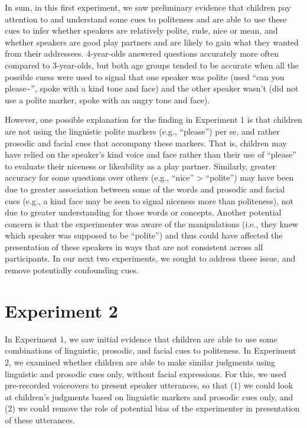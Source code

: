 \documentclass[10pt, letterpaper]{article}
\begin{document}
In sum, in this first experiment, we saw preliminary evidence that
children pay attention to and understand some cues to politeness and are
able to use these cues to infer whether speakers are relatively polite,
rude, nice or mean, and whether speakers are good play partners and are
likely to gain what they wanted from their addressees. 4-year-olds
answered questions accurately more often compared to 3-year-olds, but
both age groups tended to be accurate when all the possible cuess were
used to signal that one speaker was polite (used ``can you
please\textasciitilde{}'', spoke with a kind tone and face) and the
other speaker wasn't (did not use a polite marker, spoke with an angry
tone and face).

However, one possible explanation for the finding in Experiment 1 is
that children are not using the linguistic polite markers (e.g.,
``please'') per se, and rather prosodic and facial cues that accompany
these markers. That is, children may have relied on the speaker's kind
voice and face rather than their use of ``please'' to evaluate their
niceness or likeability as a play partner. Similarly, greater accuracy
for some questions over others (e.g., ``nice'' \textgreater{}
``polite'') may have been due to greater association between some of the
words and prosodic and facial cues (e.g., a kind face may be seen to
signal niceness more than politeness), not due to greater understanding
for those words or concepts. Another potential concern is that the
experimenter was aware of the manipulations (i.e., they knew which
speaker was supposed to be ``polite'') and thus could have affected the
presentation of these speakers in ways that are not consistent across
all participants. In our next two experiments, we sought to address
these issue, and remove potentially confounding cues.

\section{Experiment 2}\label{experiment-2}

In Experiment 1, we saw initial evidence that children are able to use
some combinations of linguistic, prosodic, and facial cues to
politeness. In Experiment 2, we examined whether children are able to
make similar judgments using linguistic and prosodic cues only, without
facial expressions. For this, we used pre-recorded voiceovers to present
speaker utterances, so that (1) we could look at children's judgments
based on linguistic markers and prosodic cues only, and (2) we could
remove the role of potential bias of the experimenter in presentation of
these utterances.
\end{document}
